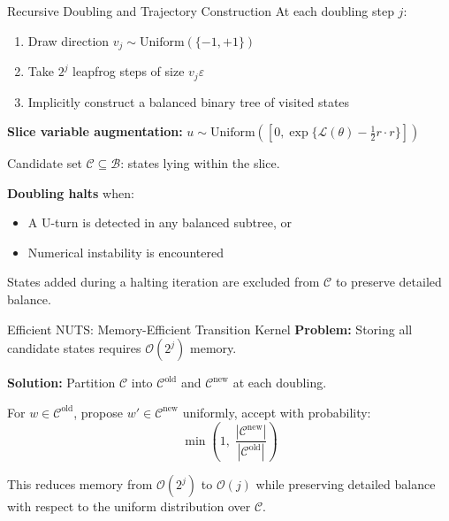 \documentclass{beamer}
\begin{document}
\begin{frame}{Recursive Doubling and Trajectory Construction}
    At each doubling step $j$:
    \begin{enumerate}
        \item Draw direction $v_j \sim \mathrm{Uniform}(\{-1,+1\})$
        \item Take $2^j$ leapfrog steps of size $v_j\varepsilon$
        \item Implicitly construct a balanced binary tree of visited states
    \end{enumerate}

    \vspace{0.2cm}
    \textbf{Slice variable augmentation:} $u \sim \mathrm{Uniform}\!\left([0,\exp\{\mathcal{L}(\theta)-\tfrac{1}{2}r\cdot r\}]\right)$

    \vspace{0.2cm}
    Candidate set $\mathcal{C} \subseteq \mathcal{B}$: states lying within the slice.

    \vspace{0.2cm}
    \textbf{Doubling halts} when:
    \begin{itemize}
        \item A U-turn is detected in any balanced subtree, or
        \item Numerical instability is encountered
    \end{itemize}

    States added during a halting iteration are excluded from $\mathcal{C}$ to preserve detailed balance.
\end{frame}

\begin{frame}{Efficient NUTS: Memory-Efficient Transition Kernel}
    \textbf{Problem:} Storing all candidate states requires $\mathcal{O}(2^j)$ memory.

    \vspace{0.2cm}
    \textbf{Solution:} Partition $\mathcal{C}$ into $\mathcal{C}^{\text{old}}$ and $\mathcal{C}^{\text{new}}$ at each doubling.

    \vspace{0.2cm}
    For $w \in \mathcal{C}^{\text{old}}$, propose $w' \in \mathcal{C}^{\text{new}}$ uniformly, accept with probability:
    \[
        \min\!\left(1,\; \frac{|\mathcal{C}^{\text{new}}|}{|\mathcal{C}^{\text{old}}|}\right)
    \]

    \vspace{0.2cm}
    This reduces memory from $\mathcal{O}(2^j)$ to $\mathcal{O}(j)$ while preserving detailed balance with respect to the uniform distribution over $\mathcal{C}$.
\end{frame}
\end{document}
